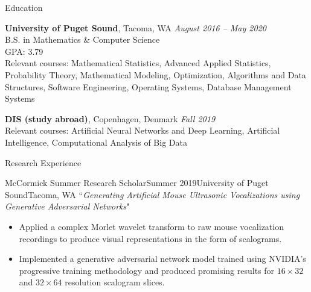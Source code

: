 \documentclass{resume} %
\begin{document}

\begin{rSection}{Education}

{\bf University of Puget Sound}, Tacoma, WA \hfill {\em August 2016 -- May 2020} \\ 
B.S. in Mathematics \& Computer Science \\
GPA: 3.79 \\
Relevant courses: Mathematical Statistics, Advanced Applied Statistics, Probability Theory, Mathematical Modeling, Optimization, Algorithms and Data Structures, Software Engineering, Operating Systems, Database Management Systems

{\bf DIS (study abroad)}, Copenhagen, Denmark \hfill {\em Fall 2019} \\
Relevant courses: Artificial Neural Networks and Deep Learning, Artificial Intelligence, Computational Analysis of Big Data

\end{rSection}



\begin{rSection}{Research Experience}

\begin{rSubsection}{McCormick Summer Research Scholar}{Summer 2019}{University of Puget Sound}{Tacoma, WA}
``\textit{Generating Artificial Mouse Ultrasonic Vocalizations using Generative Adversarial Networks}"
\renewcommand\labelitemi{$\cdot$}
\begin{itemize}
\setlength\itemsep{-0.25em}
\item Applied a complex Morlet wavelet transform to raw mouse vocalization recordings to produce visual representations in the form of scalograms.
\item Implemented a generative adversarial network model trained using NVIDIA's progressive training methodology and produced promising results for $16 \times 32$ and $32 \times 64$ resolution scalogram slices.
\end{itemize}
\end{rSubsection}

\end{rSection}
\end{document}
